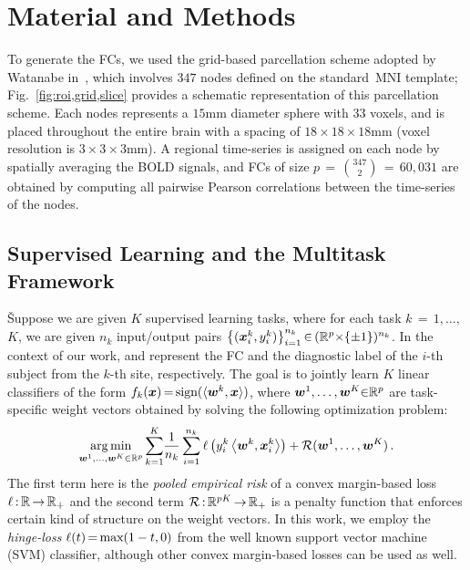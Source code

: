 \section{Material and Methods}\label{sec:methods}


To generate the FCs, we used the grid-based parcellation scheme adopted by Watanabe \etal in~\cite{Watanabe:2014}, which involves $347$ nodes defined on the standard~MNI template; Fig.~\ref{fig:roi,grid,slice} provides a schematic representation of this parcellation scheme.
Each nodes represents a $15$mm diameter sphere with $33$ voxels, and is placed throughout the entire brain with a spacing of $18{\times}18{\times}18$mm (voxel resolution is $3{\times}3{\times}3$mm).
A regional time-series is assigned on each node by spatially averaging the BOLD signals, and FCs of size $p\,{=}\,\binom{347}{2}\,{=}\,60,031$ are obtained by computing all pairwise Pearson correlations between the time-series of the nodes.


\subsection{Supervised Learning and the Multitask Framework}\v
Suppose we are given $K$ supervised learning tasks, where for each task $k{\,=}\,1,\dots,$ $K$, we are given $n_k$ input/output pairs $\big\{({\bm{x}}_i^k,y_i^k)\big\}_{i=1}^{n_k}{\,\in\,}(\mathbb{R}^p{\times}\{\pm1\})^{n_k}$.  
In the context of our work, \xik and \yik represent the FC and the diagnostic label of the $i$-th subject from the \mbox{$k$-th} site, respectively.
The goal is to jointly learn $K$ linear classifiers of the form $f_k({\bm{x}}){\,=\,}\text{sign}(\langle{\ensuremath{\bm{w}}}^k,{\bm{x}}\rangle)$, where ${\bm{w}}^1,\dots,{\bm{w}}^K{\in}\mathbb{R}^p$ are task-specific weight vectors obtained by solving the following optimization problem:
\begin{equation}
	\operatorname*{arg\,min}_{{\bm{w}}^1,\dots,{\bm{w}}^K\in\mathbb{R}^p}
	\sum_{k=1}^K \hspace{-2pt}\frac{1}{n_k}\sum_{i=1}^{n_k}\ell\left(y_i^k\mathop{\left\langle {\ensuremath{\bm{w}}}^k,{\bm{x}}_i^k\right\rangle}\nolimits\right)  + \mathcal{R}({\bm{w}}^1,\dots,{\bm{w}}^K)\,.
\nonumber
\end{equation}
The first term here is the \emph{pooled empirical risk} of a convex margin-based loss $\ell\,{:}\,\mathbb{R}\,{\to}\,\mathbb{R}_+$ and the second term $\mathcal{R}\,{:}\,\mathbb{R}^{pK}\,{\to}\,\mathbb{R}_+$ is a penalty function that enforces certain kind of structure on the weight vectors.
In this work, we employ the \emph{hinge-loss} $\ell(t)\,{=}\,\text{max}(1-t,0)$\hspace{-1.5pt} from the well known support vector machine (SVM) classifier, although other convex margin-based losses can be used as well.

